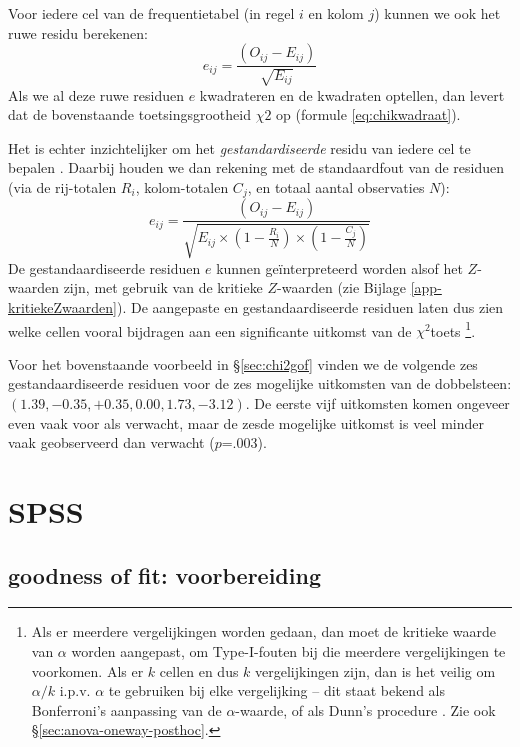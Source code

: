 \documentclass[
]{book}
\begin{document}
Voor iedere cel van de frequentietabel (in regel \(i\) en kolom \(j\)) kunnen we ook het ruwe residu berekenen:
\begin{equation}
  \label{eq:chi2-rawresidu}
  e_{ij} = \frac{(O_{ij}-E_{ij})}{\sqrt{E_{ij}}}
\end{equation}
Als we al deze ruwe residuen \(e\) kwadrateren en de kwadraten optellen, dan levert dat de bovenstaande toetsingsgrootheid \(\chi2\) op (formule \eqref{eq:chikwadraat}).

Het is echter inzichtelijker om het \emph{gestandardiseerde} residu van iedere cel te bepalen \citep[p.38]{Agre07}.
Daarbij houden we dan rekening met de standaardfout van de residuen (via de rij-totalen \(R_i\), kolom-totalen \(C_j\), en totaal aantal observaties \(N\)):
\begin{equation}
  \label{eq:chi2-stdresidu}
  e_{ij} = \frac{(O_{ij}-E_{ij})}{\sqrt{E_{ij}\times(1-\frac{R_i}{N})\times(1-\frac{C_j}{N})}}
\end{equation}
De gestandaardiseerde residuen \(e\) kunnen geïnterpreteerd worden alsof het \(Z\)-waarden zijn, met gebruik van de kritieke \(Z\)-waarden (zie Bijlage \ref{app-kritiekeZwaarden}). De aangepaste en gestandaardiseerde residuen laten dus zien welke cellen vooral bijdragen aan een significante uitkomst van de \(\chi^2\)toets \footnote{Als er meerdere vergelijkingen worden gedaan, dan moet de kritieke waarde van \(\alpha\) worden aangepast, om Type-I-fouten bij die meerdere vergelijkingen te voorkomen. Als er \(k\) cellen en dus \(k\) vergelijkingen zijn, dan is het veilig om \(\alpha/k\) i.p.v. \(\alpha\) te gebruiken bij elke vergelijking -- dit staat bekend als Bonferroni's aanpassing van de \(\alpha\)-waarde, of als Dunn's procedure \citep[p.202]{MD04}. Zie ook §\ref{sec:anova-oneway-posthoc}.}.

Voor het bovenstaande voorbeeld in §\ref{sec:chi2gof} vinden we de volgende zes gestandaardiseerde residuen voor de zes mogelijke uitkomsten van de dobbelsteen: \((1.39, -0.35, +0.35, 0.00, 1.73, -3.12)\). De eerste vijf uitkomsten komen ongeveer even vaak voor als verwacht, maar de zesde mogelijke uitkomst is veel minder vaak geobserveerd dan verwacht (\(p\)=.003).

\section{SPSS}\label{spss-14}

\subsection{goodness of fit: voorbereiding}\label{goodness-of-fit-voorbereiding}
\end{document}

